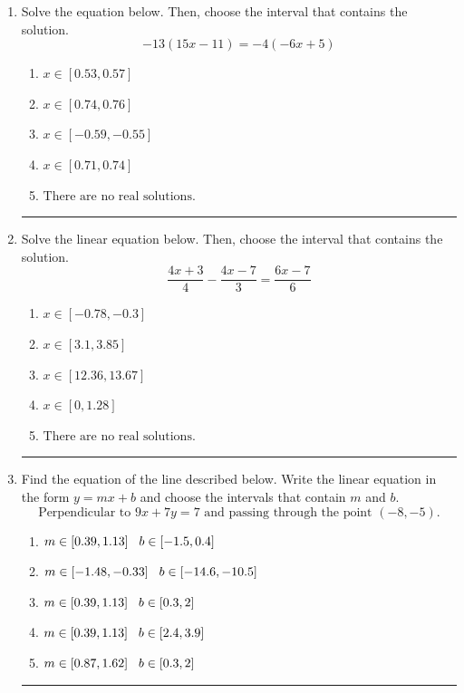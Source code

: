 \documentclass[14pt]{extbook}
\newcommand{\litem}[1]{\item#1\hspace*{-1cm}\rule{\textwidth}{0.4pt}}
\begin{document}
\begin{enumerate}
{\begin{enumerate}[label=\Alph*.]
\end{enumerate} }
\litem{
Solve the equation below. Then, choose the interval that contains the solution.\[ -13(15x -11) = -4(-6x + 5) \]\begin{enumerate}[label=\Alph*.]
\item \( x \in [0.53, 0.57] \)
\item \( x \in [0.74, 0.76] \)
\item \( x \in [-0.59, -0.55] \)
\item \( x \in [0.71, 0.74] \)
\item \( \text{There are no real solutions.} \)

\end{enumerate} }
\litem{
Solve the linear equation below. Then, choose the interval that contains the solution.\[ \frac{4x + 3}{4} - \frac{4x -7}{3} = \frac{6x -7}{6} \]\begin{enumerate}[label=\Alph*.]
\item \( x \in [-0.78, -0.3] \)
\item \( x \in [3.1, 3.85] \)
\item \( x \in [12.36, 13.67] \)
\item \( x \in [0, 1.28] \)
\item \( \text{There are no real solutions.} \)

\end{enumerate} }
\litem{
Find the equation of the line described below. Write the linear equation in the form $ y=mx+b $ and choose the intervals that contain $m$ and $b$.\[ \text{Perpendicular to } 9 x + 7 y = 7 \text{ and passing through the point } (-8, -5). \]\begin{enumerate}[label=\Alph*.]
\item \( m \in [0.39, 1.13] \hspace*{3mm} b \in [-1.5, 0.4] \)
\item \( m \in [-1.48, -0.33] \hspace*{3mm} b \in [-14.6, -10.5] \)
\item \( m \in [0.39, 1.13] \hspace*{3mm} b \in [0.3, 2] \)
\item \( m \in [0.39, 1.13] \hspace*{3mm} b \in [2.4, 3.9] \)
\item \( m \in [0.87, 1.62] \hspace*{3mm} b \in [0.3, 2] \)


\end{enumerate}}
\end{enumerate}
\end{document}
